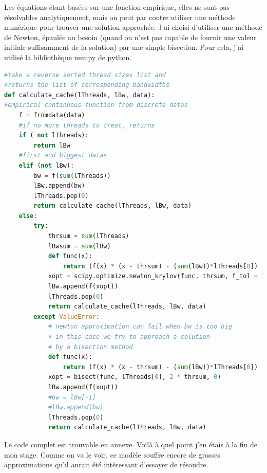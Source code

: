 \documentclass{report}
\begin{document}
Les équations étant basées sur une fonction empirique, elles ne sont pas résolvables analytiquement, 
mais on peut par contre utiliser une méthode numérique pour trouver une solution approchée. J'ai 
choisi d'utiliser une méthode de Newton, épaulée au besoin (quand on n'est pas capable de fournir 
une valeur initiale suffisamment de la solution) par une simple bisection. Pour cela, j'ai utilisé la 
bibliothèque numpy de python. 
\begin{lstlisting}[language=python]
#take a reverse sorted thread sizes list and 
#returns the list of corresponding bandwidths
def calculate_cache(lThreads, lBw, data):
#empirical continuous function from discrete datas
    f = fromdata(data)
    #if no more threads to treat, returns
    if ( not lThreads):
        return lBw
    #first and biggest datas
    elif (not lBw):
        bw = f(sum(lThreads))
        lBw.append(bw)
        lThreads.pop(0)
        return calculate_cache(lThreads, lBw, data)
    else:
        try:
            thrsum = sum(lThreads)
            lBwsum = sum(lBw)
            def func(x):
                return (f(x) * (x - thrsum) - (sum(lBw))*lThreads[0])
            xopt = scipy.optimize.newton_krylov(func, thrsum, f_tol = 1.0)
            lBw.append(f(xopt))
            lThreads.pop(0)
            return calculate_cache(lThreads, lBw, data)
        except ValueError:
            # newton approximation can fail when bw is too big
            # in this case we try to approach a solution
            # by a bisection method
            def func(x):
                return (f(x) * (x - thrsum) - (sum(lBw))*lThreads[0])
            xopt = bisect(func, lThreads[0], 2 * thrsum, 0)
            lBw.append(f(xopt))
            #bw = lBw[-1]
            #lBw.append(bw)
            lThreads.pop(0)
            return calculate_cache(lThreads, lBw, data)

\end{lstlisting}
Le code complet est trouvable en annexe. Voilà à quel point j'en étais à la fin de mon stage.
Comme on va le voir, ce modèle souffre encore de grosses approximations qu'il aurait été intéressant
d'essayer de résoudre.
\end{document}
